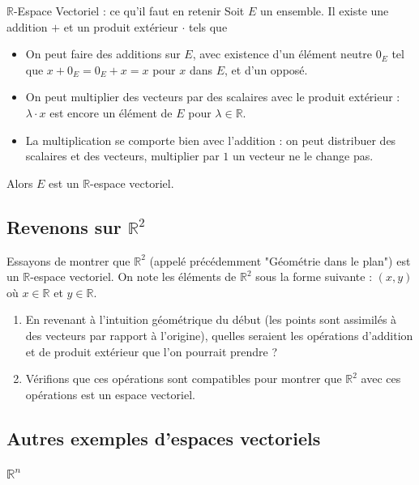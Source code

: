\documentclass{classe}
\begin{document}
\begin{définition}{$\mathbb{R}$-Espace Vectoriel : ce qu'il faut en retenir}{}
	Soit $E$ un ensemble. Il existe une addition $+$ et un produit extérieur $\cdot$ tels que
	\begin{itemize}
		\item On peut faire des additions sur $E$, avec existence d'un élément neutre $0_E$ tel que $x + 0_E = 0_E + x = x$ pour $x$ dans $E$, et d'un opposé.
		\item On peut multiplier des vecteurs par des scalaires avec le produit extérieur : $\lambda\cdot x$ est encore un élément de $E$ pour $\lambda \in \mathbb{R}$.
		\item La multiplication se comporte bien avec l'addition : on peut distribuer des scalaires et des vecteurs, multiplier par $1$ un vecteur ne le change pas.
	\end{itemize}
	Alors $E$ est un $\mathbb{R}$-espace vectoriel.
\end{définition}

\subsection{Revenons sur $\mathbb{R}^2$}

Essayons de montrer que $\mathbb{R}^2$ (appelé précédemment "Géométrie dans le plan") est un $\mathbb{R}$-espace vectoriel. On note les éléments de $\mathbb{R}^2$ sous la forme suivante : $(x, y)$ où $x\in\mathbb{R}$ et $y\in\mathbb{R}$.

\begin{enumerate}
	\item En revenant à l'intuition géométrique du début (les points sont assimilés à des vecteurs par rapport à l'origine), quelles seraient les opérations d'addition et de produit extérieur que l'on pourrait prendre ?
	\item Vérifions que ces opérations sont compatibles pour montrer que $\mathbb{R}^2$ avec ces opérations est un espace vectoriel.
\end{enumerate}

\subsection{Autres exemples d'espaces vectoriels}

\subsubsection{$\mathbb{R}^n$}
\end{document}
